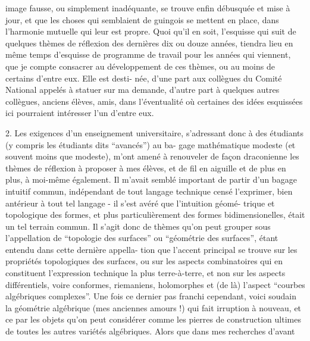 
image fausse, ou simplement inadéquante, se trouve enfin débusquée
et mise à jour, et que les choses qui semblaient de guingois se
mettent en place, dans l'harmonie mutuelle qui leur est propre.
\qquad Quoi qu'il en soit, l'esquisse qui suit de quelques
thèmes de réflexion des dernières dix ou douze années, tiendra
lieu en même temps d'esquisse de programme de travail pour les
années qui viennent, que je compte consacrer au développement de
ces thèmes, ou au moins de certains d'entre eux. Elle est desti-%
née, d'une part aux collègues du Comité National appelés à statuer
sur ma demande, d'autre part à quelques autres collègues, anciens
élèves, amis, dans l'éventualité où certaines des idées esquissées
ici pourraient intéresser l'un d'entre eux.

2. \qquad Les exigences d'un enseignement universitaire, s'adressant
donc à des étudiants (y compris les étudiants dits ``avancés'') au ba-%
gage mathématique modeste (et souvent moins que modeste), m'ont amené
à renouveler de façon draconienne les thèmes de réflexion à proposer
à mes élèves, et de fil en aiguille et de plus en plus, à moi-même
également. Il m'avait semblé important de partir d'un bagage intuitif
commun, indépendant de tout langage technique censé l'exprimer, bien
antérieur à tout tel langage - il s'est avéré que l'intuition géomé-%
trique et topologique des formes, et plus particulièrement des formes
bidimensionelles, était un tel terrain commun. Il s'agit donc de thèmes
qu'on peut grouper sous l'appellation de ``topologie des surfaces'' ou
``géométrie des surfaces'', étant entendu dans cette dernière appella-%
tion que l'accent principal se trouve sur les propriétés topologiques
des surfaces, ou sur les aspects combinatoires qui en constituent
l'expression technique la plus terre-à-terre, et non sur les aspects
différentiels, voire conformes, riemaniens, holomorphes et (de là)
l'aspect ``courbes algébriques complexes''. Une fois ce dernier pas
franchi cependant, voici soudain la géométrie algébrique (mes anciennes
amours !) qui fait irruption à nouveau, et ce par les objets qu'on
peut considérer comme les pierres de construction ultimes de toutes
les autres variétés algébriques. Alors que dans mes recherches d'avant

